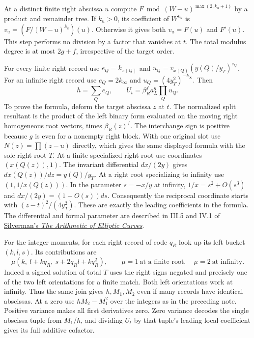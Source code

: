 \documentclass[11pt]{article}
\begin{document}
At a distinct finite right abscissa $u$ compute
$F\bmod(W-u)^{\max(2,k_u+1)}$ by a product and remainder tree.
If $k_u>0$, its coefficient of $W^{k_u}$ is
$v_u=(F/(W-u)^{k_u})(u)$. Otherwise it gives both
$v_u=F(u)$ and $F'(u)$. This step performs no division by a
factor that vanishes at $t$. The total modulus degree is at most
$2g+f$, irrespective of the target order.

For every finite right record use $e_Q=k_{x(Q)}$ and
$u_Q=v_{x(Q)}(y(Q)/y_T)^{e_Q}$. For an infinite right record
use $e_Q=2k_\infty$ and $u_Q=(4y_T^2)^{-k_\infty}$. Then
\[
 h=\sum_Q e_Q,\qquad
 U_t=\beta_R^f a_L^g\prod_Q u_Q .
\]
To prove the formula, deform the target abscissa $z$ at $t$.
The normalized split resultant is the product of the left binary
form evaluated on the moving right homogeneous root vectors, times
$\beta_R(z)^f$. The interchange sign is positive because $g$ is
even for a nonempty right block. With one original slot use
$N(z)=\prod(z-u)$ directly, which gives the same displayed formula
with the sole right root $T$. At a finite specialized right root
use coordinates $(x(Q(z)),1)$. The invariant differential
$dx/(2y)$ gives $dx(Q(z))/dz=y(Q)/y_T$. At a right root
specializing to infinity use $(1,1/x(Q(z)))$. In the parameter
$s=-x/y$ at infinity, $1/x=s^2+O(s^3)$ and
$dx/(2y)=(1+O(s))ds$. Consequently the reciprocal coordinate
starts with $(z-t)^2/(4y_T^2)$. These are exactly the leading
coefficients in the formula. The differential and formal parameter
are described in III.5 and IV.1 of
\href{https://www.math.brown.edu/johsilve/AECHome.html}
{Silverman's \emph{The Arithmetic of Elliptic Curves}}.

For the integer moments, for each right record of code $q_R$
look up its left bucket $(k,l,s)$. Its contributions are
\[
 \mu(k,\ l+kq_R,\ s+2q_Rl+kq_R^2),
 \qquad \mu=1\ \text{at a finite root},\quad \mu=2\ \text{at infinity}.
\]
Indeed a signed solution of total $T$ uses the right signs negated
and precisely one of the two left orientations for a finite match.
Both left orientations work at infinity. Thus the same join gives
$h,M_1,M_2$ even if many records have identical abscissas. At a
zero use $hM_2-M_1^2$ over the integers as in the preceding note.
Positive variance makes all first derivatives zero. Zero variance
decodes the single abscissa tuple from $M_1/h$, and dividing
$U_t$ by that tuple's leading local coefficient gives its full
additive cofactor.
\end{document}
